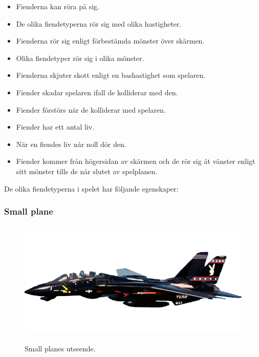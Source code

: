 \documentclass{TDP005mall}
\begin{document}
\begin{itemize}
\item Fienderna kan röra på sig.
\item De olika fiendetyperna rör sig med olika hastigheter.
\item Fienderna rör sig enligt förbestämda mönster över skärmen.
\item Olika fiendetyper rör sig i olika mönster.
\item Fienderna skjuter skott enligt en bashastighet som spelaren.
\item Fiender skadar spelaren ifall de kolliderar med den.
\item Fiender förstörs när de kolliderar med spelaren.
\item Fiender har ett antal liv. 
\item När en fiendes liv når noll dör den.
\item Fiender kommer från högersidan av skärmen och de rör sig åt vänster enligt sitt mönster tills de når slutet av spelplanen.
\end{itemize}

De olika fiendetyperna i spelet har följande egenskaper:

\subsubsection*{Small plane}

\begin{figure}[h!]
  \centering
  \includegraphics[scale=0.15]{Images/Enemy1.png}
  \label{}
  \caption{Small planes utseende.}
\end{figure}
\end{document}

